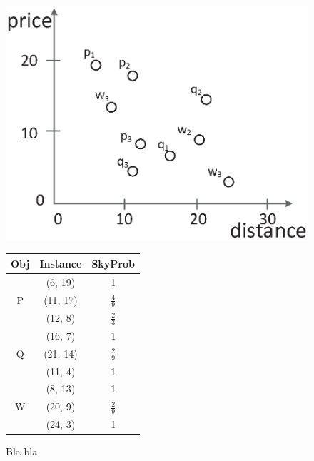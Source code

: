 \begin{figure}
   \hspace{-35pt}
  \begin{minipage}[b]{0.80\linewidth}
    \centering
  	\includegraphics[width=0.8\linewidth]{figs/example.eps}
  	\par\vspace{-20pt}
  \end{minipage}%
  \hspace{-25pt}
  \begin{minipage}[b]{0.20\linewidth}
    \centering


  \begin{tabular}{|c|c|c|} \hline
  Obj & Instance & SkyProb \\ \hline \hline

  \multirow{3}{*}{P} & (6, 19) & 1 \\

  \cline{2-3}
    & (11, 17) & $\frac{4}{9}$ \\ 
  \cline{2-3}
    & (12, 8) & $\frac{2}{3}$  \\ \hline

  \multirow{3}{*}{Q} & (16, 7) & 1 \\

  \cline{2-3}
    & (21, 14) & $\frac{2}{9}$  \\ 
  \cline{2-3}
    & (11, 4) & 1  \\ \hline

  \multirow{3}{*}{W} & (8, 13) & 1 \\

  \cline{2-3}
    & (20, 9) & $\frac{2}{9}$  \\ 
  \cline{2-3}
    & (24, 3) & 1  \\ \hline
  \end{tabular}
  \hspace{-50pt}
\end{minipage}
\vspace{10pt}
\caption{Bla bla}
\label{fig:example}
\vspace{-10pt}
\end{figure}

